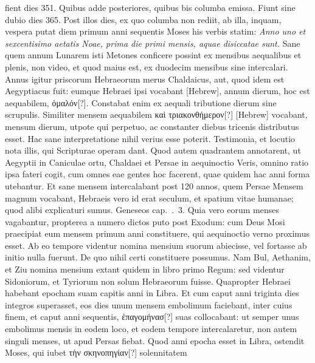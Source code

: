 fient dies 351.
Quibus adde  posteriores, quibus bis columba
emissa.
Fiunt sine dubio dies 365.
Post illos  dies, ex quo columba
non rediit, ab illa, inquam, vespera putat diem primum anni sequentis
Moses his verbis statim: \textit{Anno uno et sexcentisimo aetatis Noae,
prima die primi mensis, aquae disiccatae sunt.}
Sane quem annum Lunarem
isti Metones conficere possint ex mensibus aequalibus et plenis,
non video, et quod maius est, ex duodecim mensibus sine intercalari.
Annus igitur priscorum Hebraeorum merus Chaldaicus,
aut, quod idem est Aegyptiacus fuit: eumque Hebraei ipsi vocabant
\texthebrew{}[Hebrew], annum dierum, hoc est aequabilem,
 \textgreek{ὁμαλόν}[?].
Constabat
enim ex aequali tributione dierum sine scrupulis.
Similiter mensem
aequabilem \textgreek{καὶ τριακονθήμερον}[?]
 \texthebrew{}[Hebrew] vocabant, mensum dierum, utpote
qui perpetuo, ac constanter diebus tricenis distributus esset.
Hac sane interpretatione nihil verius esse poterit.
Testimonia, et locutio
nota illis, qui Scripturae operam dant.
Quod autem quadrantem
annotarent, ut Aegyptii in Caniculae ortu, Chaldaei et Persae in aequinoctio
Veris, omnino ratio ipsa fateri cogit, cum omnes eae gentes
hoc facerent, quae quidem hac anni forma utebantur.
Et sane
mensem intercalabant post 120 annos, quem Persae Mensem magnum
vocabant, Hebraeis vero id erat seculum, et spatium vitae humanae;
quod alibi explicaturi sumus.
Geneseos cap.\ .\ 3.
Quia vero
eorum menses vagabantur, propterea a numero dictos puto post
Exodum: cum Deus Mosi praecipiat eum mensem primum anni
constituere, qui aequinoctio verno proximus esset.
%
Ab eo tempore
videntur nomina mensium suorum abiecisse, vel fortasse ab initio
nulla fuerunt.
De quo nihil certi constituere possumus.
Nam Bul,
Aethanim, et Ziu nomina mensium extant quidem in libro primo
Regum: sed videntur Sidoniorum, et Tyriorum non solum Hebraeorum
fuisse.
Quapropter Hebraei habebant epocham suam capitis anni
in Libra.
Et cum caput anni triginta dies integros superasset, eos
dies unum mensem embolimum faciebant, inter cuius finem, et caput
anni sequentis, \textgreek{ἐπαγομήνασ}[?] suas collocabant:
 ut semper unus embolimus
mensis in eodem loco, et eodem tempore intercalaretur,
non autem singuli menses, ut apud Persas fiebat.
Quod anni epocha
esset in Libra, ostendit Moses, qui iubet
 \textgreek{τὴν σκηνοπηγίαν}[?] solennitatem
